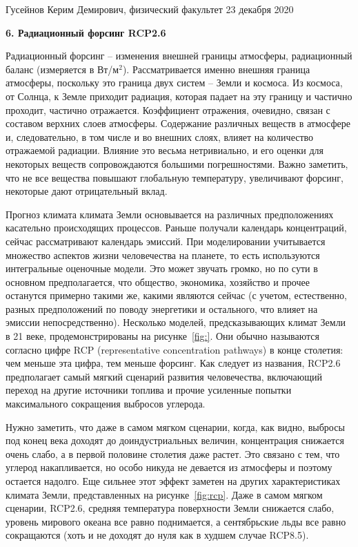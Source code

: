 \documentclass[a4paper, 12pt]{article}
\begin{document}
\noindent
Гусейнов Керим Демирович, физический факультет
\hfill
23 декабря 2020

\begin{center}
	\textbf{6. Радиационный форсинг RCP2.6}
\end{center}

Радиационный форсинг -- изменения внешней границы атмосферы, 
радиационный баланс (измеряется в Вт/м$^2$). Рассматривается именно 
внешняя граница атмосферы, поскольку это граница двух систем -- Земли 
и космоса. Из космоса, от Солнца, к Земле приходит радиация, которая 
падает на эту границу и частично проходит, частично отражается. 
Коэффициент отражения, очевидно, связан с составом верхних слоев 
атмосферы. Содержание различных веществ в атмосфере и, следовательно, 
в том числе и во внешних слоях, влияет на количество отражаемой 
радиации. Влияние это весьма нетривиально, и его оценки для некоторых 
веществ сопровождаются большими погрешностями. Важно заметить, что не 
все вещества повышают глобальную температуру, увеличивают форсинг, 
некоторые дают отрицательный вклад.

Прогноз климата климата Земли основывается на различных предположениях 
касательно происходящих процессов. Раньше получали календарь 
концентраций, сейчас рассматривают календарь эмиссий. При 
моделировании учитывается множество аспектов жизни человечества на 
планете, то есть используются интегральные оценочные модели. Это может 
звучать громко, но по сути в основном предполагается, что общество, 
экономика, хозяйство и прочее останутся примерно такими же, какими 
являются сейчас (с учетом, естественно, разных предположений по поводу 
энергетики и остального, что влияет на эмиссии непосредственно). 
Несколько моделей, предсказывающих климат Земли в 21 веке, 
продемонстрированы на рисунке~\ref{fig:}. Они обычно называются 
согласно цифре RCP (representative concentration pathways) в конце 
столетия: чем меньше эта цифра, тем меньше форсинг. Как следует из 
названия, RCP2.6 предполагает самый мягкий сценарий развития 
человечества, включающий переход на другие источники топлива и прочие 
усиленные попытки максимального сокращения выбросов углерода.

Нужно заметить, что даже в самом мягком сценарии, когда, как видно, 
выбросы под конец века доходят до доиндустриальных величин, 
концентрация снижается очень слабо, а в первой половине столетия даже 
растет. Это связано с тем, что углерод накапливается, но особо никуда 
не девается из атмосферы и поэтому остается надолго. Еще сильнее этот 
эффект заметен на других характеристиках климата Земли, представленных 
на рисунке~\ref{fig:rcp}. Даже в самом мягком сценарии, RCP2.6, 
средняя температура поверхности Земли снижается слабо, уровень 
мирового океана все равно поднимается, а сентябрьские льды все равно 
сокращаются (хоть и не доходят до нуля как в худшем случае RCP8.5).
\end{document}
